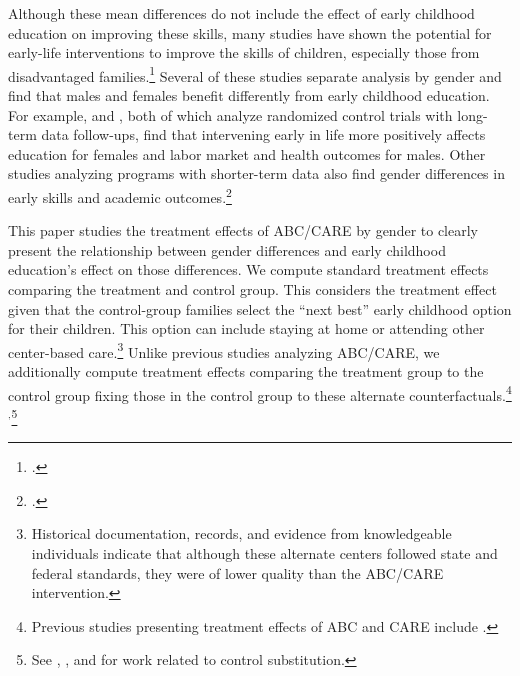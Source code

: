 Although these mean differences do not include the effect of early childhood education on improving these skills, many studies have shown the potential for early-life interventions to improve the skills of children, especially those from disadvantaged families.\footnote{\citet{Currie_2011_AER,Elango_Hojman_etal_2016_Early-Edu}.} Several of these studies separate analysis by gender and find that males and females benefit differently from early childhood education. For example, \citet{Heckman_Moon_etal_2010_QE} and \citet{Garcia_etal_2016_Comp_CBA_Unpublished}, both of which analyze randomized control trials with long-term data follow-ups, find that intervening early in life more positively affects education for females and labor market and health outcomes for males. Other studies analyzing programs with shorter-term data also find gender differences in early skills and academic outcomes.\footnote{\citet{Deming_2009_AEJAE,Ou_Reynolds_2010_Mechanisms_CYSR,Magnuson_Kelchen_Duncan_etal_2016_ECRQ}.} 

This paper studies the treatment effects of ABC/CARE by gender to clearly present the relationship between gender differences and early childhood education's effect on those differences. We compute standard treatment effects comparing the treatment and control group. This considers the treatment effect given that the control-group families select the ``next best'' early childhood option for their children. This option can include staying at home or attending other center-based care.\footnote{Historical documentation, records, and evidence from knowledgeable individuals indicate that although these alternate centers followed state and federal standards, they were of lower quality than the ABC/CARE intervention.} Unlike previous studies analyzing ABC/CARE, we additionally compute treatment effects comparing the treatment group to the control group fixing those in the control group to these alternate counterfactuals.\footnote{Previous studies presenting treatment effects of ABC and CARE include \citet{Ramey_etal_1985_Project-CARE_TiECSE, Clarke_Campbell_1998_ABC_Comparison_ECRQ,Campbell_Pungello_etal_2001_DP,Campbell_Ramey_etal_2002_ADS,Campbell_Wasik_etal_2008_ECRQ,Campbell_Conti_etal_2014_EarlyChildhoodInvestments}.}$^,$\footnote{See \cite{Heckman_1992_randomization}, \cite{Heckman_Hohmann_etal_2000_QJE}, and \cite{Kline_Walters_2016_QJE} for work related to control substitution.} 

